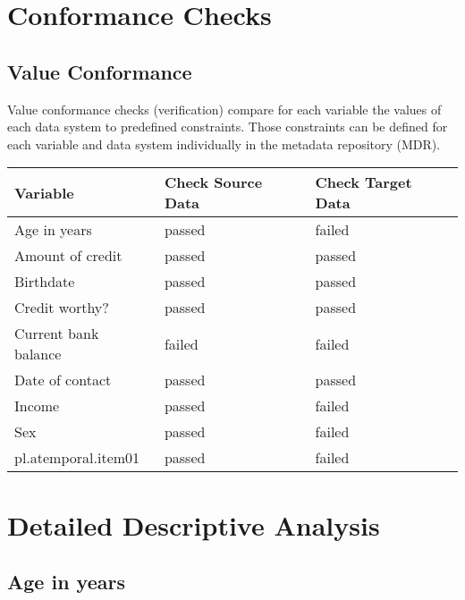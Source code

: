 \documentclass[
]{article}
\begin{document}
\newpage

\hypertarget{conformance-checks}{%
\section{Conformance Checks}\label{conformance-checks}}

\hypertarget{value-conformance}{%
\subsection{Value Conformance}\label{value-conformance}}

Value conformance checks (verification) compare for each variable the
values of each data system to predefined constraints. Those constraints
can be defined for each variable and data system individually in the
metadata repository (MDR).

\begin{table}[H]
\centering
\begin{tabular}{l|l|l}
\hline
\textbf{Variable} & \textbf{Check Source Data} & \textbf{Check Target Data}\\
\hline
Age in years & passed & failed\\
\hline
Amount of credit & passed & passed\\
\hline
Birthdate & passed & passed\\
\hline
Credit worthy? & passed & passed\\
\hline
Current bank balance & failed & failed\\
\hline
Date of contact & passed & passed\\
\hline
Income & passed & failed\\
\hline
Sex & passed & failed\\
\hline
pl.atemporal.item01 & passed & failed\\
\hline
\end{tabular}
\end{table}

\newpage

\hypertarget{detailed-descriptive-analysis}{%
\section{Detailed Descriptive
Analysis}\label{detailed-descriptive-analysis}}

\hypertarget{age-in-years}{%
\subsection{Age in years}\label{age-in-years}}
\end{document}

